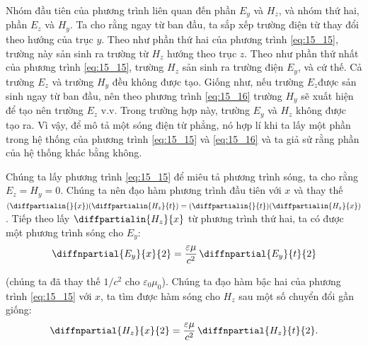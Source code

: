 Nhóm đầu tiên của phương trình liên quan đến phần $E_y$ và $H_z$, và nhóm thứ hai, phần $E_z$ và $H_y$.
Ta cho rằng ngay từ ban đầu, ta sắp xếp trường điện từ thay đổi theo hướng của trục $y$.
Theo như phần thứ hai của phương trình \eqref{eq:15_15}, trường này sản sinh ra trường từ $H_z$ hướng theo trục $z$.
Theo như phần thứ nhất của phương trình \eqref{eq:15_15}, trường $H_z$ sản sinh ra trường điện $E_y$, và cứ thế.
Cả trường $E_z$ và trường $H_y$ đều  không được tạo. 
Giống như, nếu trường $E_z$được sản sinh ngay từ ban đầu, nên theo phương trình \eqref{eq:15_16} trường $H_y$ sẽ xuất hiện để tạo nên trường $E_z$ v.v.
Trong trường hợp này, trường $E_y$ và $H_z$ không được tạo ra.
Vì vậy, để mô tả một sóng điện từ phẳng, nó hợp lí khi ta lấy một phần trong hệ thống của phương trình \eqref{eq:15_15} và \eqref{eq:15_16} và ta giả sử rằng phần của hệ thống khác bằng không.




Chúng ta lấy phương trình \eqref{eq:15_15} để miêu tả phương trình sóng, ta cho rằng $E_z=H_y=0$.
Chúng ta nên đạo hàm phương trình đầu tiên với $x$ và thay thế $(\diffpartialin{}{x}) (\diffpartialin{H_z}{t}) = (\diffpartialin{}{t}) (\diffpartialin{H_z}{x})$.
Tiếp theo lấy $\diffpartialin{H_z}{x}$ từ phương trình thứ hai, ta có được một phương trình sóng cho $E_y$:
\begin{equation}\label{eq:15_17}
    \diffnpartial{E_y}{x}{2} = \frac{\varepsilon\mu}{c^2}\, \diffnpartial{E_y}{t}{2}
\end{equation}

\noindent
(chúng ta đã thay thế $1/c^2$ cho $\varepsilon_0 \mu_0$).
Chúng ta đạo hàm bậc hai của phương trình \eqref{eq:15_15} với $x$, ta tìm được hàm sóng cho $H_z$ sau một số chuyển đổi gần giống:
\begin{equation}\label{eq:15_18}
    \diffnpartial{H_z}{x}{2} = \frac{\varepsilon\mu}{c^2}\, \diffnpartial{H_z}{t}{2}.
\end{equation}

